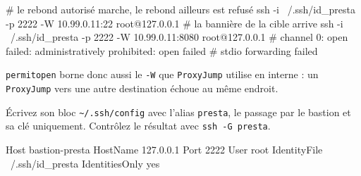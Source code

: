 \documentclass[a4paper,10pt]{exam}
\begin{document}
\begin{questions}
\begin{solution}
\begin{bashcode}
# le rebond autorisé marche, le rebond ailleurs est refusé
ssh -i ~/.ssh/id_presta -p 2222 -W 10.99.0.11:22 root@127.0.0.1   # la bannière de la cible arrive
ssh -i ~/.ssh/id_presta -p 2222 -W 10.99.0.11:8080 root@127.0.0.1
# channel 0: open failed: administratively prohibited: open failed
# stdio forwarding failed
\end{bashcode}
\texttt{permitopen} borne donc aussi le \texttt{-W} que \texttt{ProxyJump} utilise en
interne : un \texttt{ProxyJump} vers une autre destination échoue au même endroit.
\end{solution}
\question Écrivez son bloc \texttt{\textasciitilde/.ssh/config} avec l'alias
\texttt{presta}, le passage par le bastion et sa clé uniquement. Contrôlez le résultat
avec \texttt{ssh -G presta}.
\begin{solution}
\begin{bashcode}
Host bastion-presta
    HostName 127.0.0.1
    Port 2222
    User root
    IdentityFile ~/.ssh/id_presta
    IdentitiesOnly yes


\end{bashcode}
\end{solution}
\end{questions}
\end{document}
